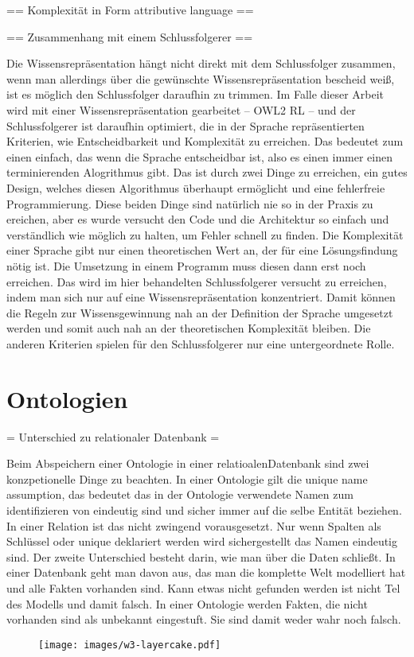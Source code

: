 == Komplexität in Form attributive language ==

== Zusammenhang mit einem Schlussfolgerer ==

Die Wissensrepräsentation hängt nicht direkt mit dem Schlussfolger zusammen, wenn man allerdings über die gewünschte Wissensrepräsentation bescheid weiß, ist es möglich den Schlussfolger daraufhin zu trimmen. Im Falle dieser Arbeit wird mit einer Wissensrepräsentation gearbeitet -- OWL2 RL -- und der Schlussfolgerer ist daraufhin optimiert, die in der Sprache repräsentierten Kriterien, wie Entscheidbarkeit und Komplexität zu erreichen.
Das bedeutet  zum einen einfach, das wenn die Sprache entscheidbar ist, also es einen immer einen terminierenden Alogrithmus gibt. Das ist durch zwei Dinge zu erreichen, ein gutes Design, welches diesen Algorithmus überhaupt ermöglicht und eine fehlerfreie Programmierung. Diese  beiden Dinge sind natürlich nie so in der Praxis zu ereichen, aber es wurde versucht den Code und die Architektur so einfach und verständlich wie möglich zu halten, um Fehler schnell zu finden.
Die Komplexität einer Sprache gibt nur einen theoretischen Wert an, der für eine Lösungsfindung nötig ist. Die Umsetzung in einem Programm muss diesen dann erst noch erreichen. Das wird im hier behandelten Schlussfolgerer versucht zu erreichen, indem man sich nur auf eine Wissensrepräsentation konzentriert. Damit können die Regeln zur Wissensgewinnung nah an der Definition der Sprache umgesetzt werden und somit auch nah an der theoretischen Komplexität bleiben.
Die anderen Kriterien spielen für den Schlussfolgerer nur eine untergeordnete Rolle.

\section{Ontologien}
= Unterschied zu relationaler Datenbank =

Beim Abspeichern einer Ontologie in einer relatioalenDatenbank sind zwei konzpetionelle Dinge zu beachten. In einer Ontologie gilt die unique name assumption, das bedeutet das in der Ontologie verwendete Namen zum identifizieren von  eindeutig sind und sicher immer auf die selbe Entität beziehen. In einer Relation ist das nicht zwingend vorausgesetzt. Nur wenn Spalten als Schlüssel oder unique deklariert werden wird sichergestellt das Namen eindeutig sind.
Der zweite Unterschied besteht darin, wie man über die Daten schließt. In einer Datenbank geht man davon aus, das man die komplette Welt modelliert hat und alle Fakten vorhanden sind. Kann etwas nicht gefunden werden ist nicht Tel des Modells und damit falsch. In einer Ontologie werden Fakten, die nicht vorhanden sind als unbekannt eingestuft. Sie sind damit weder wahr noch falsch.
\begin{figure}
\texttt{[image: images/w3-layercake.pdf]}
\end{figure}

